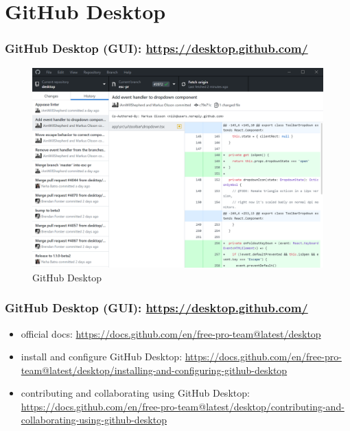 \documentclass{beamer}
\begin{document}
\section{GitHub Desktop}

\begin{frame}[fragile]
\frametitle{GitHub Desktop (GUI): \href{https://desktop.github.com/}{https://desktop.github.com/}}
\begin{figure}[!htbp]
\includegraphics[width=\textwidth,keepaspectratio]{figs/github-desktop-screenshot-windows.png}
\caption{GitHub Desktop}
\end{figure}
\end{frame}





\begin{frame}[fragile]
\frametitle{GitHub Desktop (GUI): \href{https://desktop.github.com/}{https://desktop.github.com/}}
\begin{itemize}
\item official docs: \href{https://docs.github.com/en/free-pro-team@latest/desktop}{https://docs.github.com/en/free-pro-team@latest/desktop}
\item install and configure GitHub Desktop: \href{https://docs.github.com/en/free-pro-team@latest/desktop/installing-and-configuring-github-desktop}{https://docs.github.com/en/free-pro-team@latest/desktop/installing-and-configuring-github-desktop}
\item contributing and collaborating using GitHub Desktop: \href{https://docs.github.com/en/free-pro-team@latest/desktop/contributing-and-collaborating-using-github-desktop}{https://docs.github.com/en/free-pro-team@latest/desktop/contributing-and-collaborating-using-github-desktop}
\end{itemize}
\end{frame}
\end{document}
